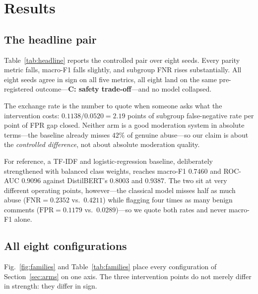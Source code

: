 \documentclass[conference]{IEEEtran}
\begin{document}
\section{Results}
\label{sec:results}

\subsection{The headline pair}
\label{sec:headline}
Table~\ref{tab:headline} reports the controlled pair over eight seeds. Every
parity metric falls, macro-F1 falls slightly, and subgroup FNR rises
substantially. All eight seeds agree in sign on all five metrics, all eight land
on the same pre-registered outcome---\textbf{C: safety trade-off}---and no model
collapsed.

\begin{table}[t]
\caption{The controlled pair, eight seeds. Columns are means over seeds; $\Delta$
is the mean of the \emph{per-seed} differences, which is what makes the interval
and the sign test paired. The sign column counts seeds moving in the direction
the row is about.}
\label{tab:headline}
\centering
\small

\end{table}

The exchange rate is the number to quote when someone asks what the intervention
costs: $0.1138 / 0.0520 = 2.19$ points of subgroup false-negative rate per point
of FPR gap closed. Neither arm is a good moderation system in absolute terms---the
baseline already misses $42\%$ of genuine abuse---so our claim is about the
\emph{controlled difference}, not about absolute moderation quality.

For reference, a TF-IDF and logistic-regression baseline, deliberately
strengthened with balanced class weights, reaches macro-F1 $0.7460$ and ROC-AUC
$0.9096$ against DistilBERT's $0.8003$ and $0.9387$. The two sit at very
different operating points, however---the classical model misses half as much
abuse ($\mathrm{FNR} = 0.2352$ vs.\ $0.4211$) while flagging four times as many
benign comments ($\mathrm{FPR} = 0.1179$ vs.\ $0.0289$)---so we quote both rates
and never macro-F1 alone.

\subsection{All eight configurations}
Fig.~\ref{fig:families} and Table~\ref{tab:families} place every configuration of
Section~\ref{sec:arms} on one axis. The three intervention points do not merely
differ in strength: they differ in sign.
\end{document}
